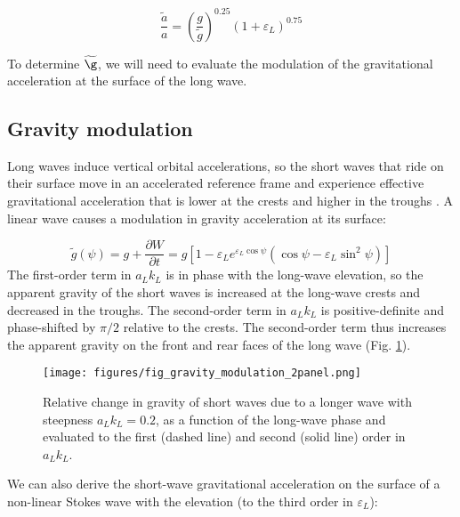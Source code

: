 \documentclass[draft]{agujournal2019}
\begin{document}
\begin{equation}
\label{eq:wave_amplitude_modulation_order1}
\dfrac{\widetilde{a}}{a} = 
  \left( \dfrac{g}{\widetilde{g}} \right)^{0.25}
  \left( 1 + \varepsilon_L \right)^{0.75}
\end{equation}

To determine $\widetilde{\g}$, we will need to evaluate the modulation of
the gravitational acceleration at the surface of the long wave.

\subsection{Gravity modulation}
\label{subsection:gravity_modulation}

Long waves induce vertical orbital accelerations, so the short
waves that ride on their surface move in an accelerated reference frame and
experience effective gravitational acceleration that is lower at the crests and
higher in the troughs \cite{longuet1986eulerian,longuet1987propagation}.
A linear wave causes a modulation in gravity acceleration at its surface:

\begin{equation}
\label{eq:gravity_modulation_linear}
\widetilde{g}(\psi) = g + \dfrac{\partial W}{\partial t} = g \left[
  1 - \varepsilon_L e^{\varepsilon_L \cos{\psi}} \left(
    \cos{\psi} - \varepsilon_L \sin^2{\psi}
  \right)
\right]
\end{equation}
The first-order term in $a_L k_L$ is in phase with the long-wave elevation,
so the apparent gravity of the short waves is increased at the long-wave crests
and decreased in the troughs.
The second-order term in $a_L k_L$ is positive-definite and phase-shifted by
$\pi/2$ relative to the crests.
The second-order term thus increases the apparent gravity on the front and rear
faces of the long wave (Fig. \ref{fig:gravity_modulation}).

\begin{figure}[h]
\label{fig:gravity_modulation}
\centering
\texttt{[image: figures/fig\_gravity\_modulation\_2panel.png]}
\caption{
  Relative change in gravity of short waves due to a longer wave with steepness $a_L k_L = 0.2$,
  as a function of the long-wave phase and evaluated to the first (dashed line) and second (solid line) order in $a_L k_L$.
}
\end{figure}

We can also derive the short-wave gravitational acceleration on the surface of
a non-linear Stokes wave with the elevation (to the third order in $\varepsilon_L$):
\end{document}
